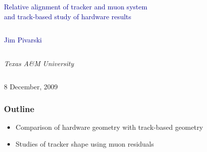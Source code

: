 \documentclass[compress]{beamer}
\begin{document}
\begin{frame}
\vfill
\begin{center}
\textcolor{darkblue}{\Large Relative alignment of tracker and muon system \\ \vspace{0.2 cm} and track-based study of hardware results}

\vfill
\begin{columns}
\begin{center}
\large
\textcolor{darkblue}{Jim Pivarski}
\end{center}
\end{columns}

\begin{columns}
\begin{center}
\scriptsize
{\it Texas A\&M University}
\end{center}
\end{columns}

\vfill
 8 December, 2009

\end{center}
\end{frame}


\small

\begin{frame}
\frametitle{Outline}
\begin{itemize}\setlength{\itemsep}{0.75 cm}
\item Comparison of hardware geometry with track-based geometry
\item Studies of tracker shape using muon residuals
\end{itemize}
\end{frame}
\end{document}
